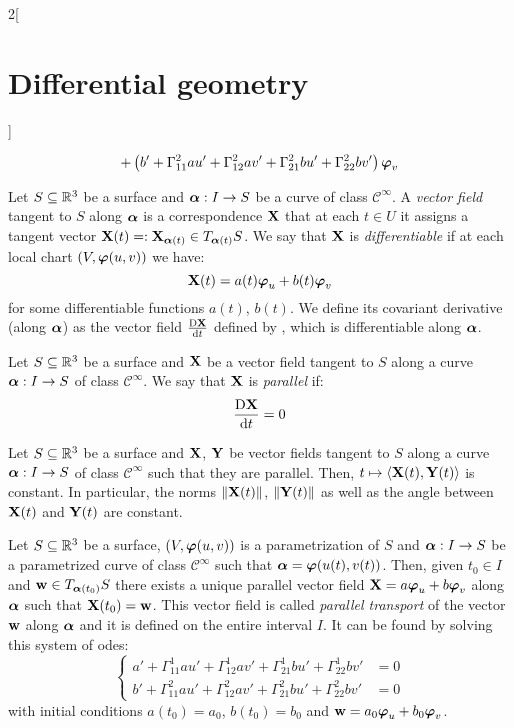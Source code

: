 \documentclass[../../../main_math.tex]{subfiles}
\begin{document}
\begin{multicols}{2}[\section{Differential geometry}]
\begin{proposition}
\begin{multline}
      +\left(b'+\Gamma_{11}^2au'+\Gamma_{12}^2av'+\Gamma_{21}^2bu'+\Gamma_{22}^2bv'\right)\boldsymbol{\mathrm{\varphi}}_v
    \end{multline}
  \end{proposition}
  \begin{definition}
    Let $S\subseteq\mathbb{R}^3$ be a surface and $\boldsymbol{\mathrm{\alpha}}:I\rightarrow S$ be a curve of class $\mathcal{C}^\infty$. A \emph{vector field} tangent to $S$ along $\boldsymbol{\mathrm{\alpha}}$ is a correspondence $\boldsymbol{\mathrm{X}}$ that at each $t\in U$ it assigns a tangent vector $\boldsymbol{\mathrm{X}}(t)=:\boldsymbol{\mathrm{X}}_{\boldsymbol{\mathrm{\alpha}}(t)}\in T_{\boldsymbol{\mathrm{\alpha}}(t)}S$. We say that $\boldsymbol{\mathrm{X}}$ is \emph{differentiable} if at each local chart $(V,\boldsymbol{\mathrm{\varphi}}(u,v))$ we have: $$\boldsymbol{\mathrm{X}}(t)=a(t)\boldsymbol{\mathrm{\varphi}}_u+b(t)\boldsymbol{\mathrm{\varphi}}_v$$ for some differentiable functions $a(t)$, $b(t)$. We define its covariant derivative (along $\boldsymbol{\mathrm{\alpha}}$) as the vector field $\frac{\text{D}\boldsymbol{\mathrm{X}}}{\dd{t}}$ defined by , which is differentiable along $\boldsymbol{\mathrm{\alpha}}$.
  \end{definition}
  \begin{definition}
    Let $S\subseteq\mathbb{R}^3$ be a surface and $\boldsymbol{\mathrm{X}}$ be a vector field tangent to $S$ along a curve $\boldsymbol{\mathrm{\alpha}}:I\rightarrow S$ of class $\mathcal{C}^\infty$. We say that $\boldsymbol{\mathrm{X}}$ is \emph{parallel} if: $$\frac{\text{D}\boldsymbol{\mathrm{X}}}{\dd{t}}=0$$
  \end{definition}
  \begin{proposition}
    Let $S\subseteq\mathbb{R}^3$ be a surface and $\boldsymbol{\mathrm{X}}$, $\boldsymbol{\mathrm{Y}}$ be vector fields tangent to $S$ along a curve $\boldsymbol{\mathrm{\alpha}}:I\rightarrow S$ of class $\mathcal{C}^\infty$ such that they are parallel. Then, $t\mapsto\langle \boldsymbol{\mathrm{X}}(t),\boldsymbol{\mathrm{Y}}(t)\rangle$ is constant. In particular, the norms $\|\boldsymbol{\mathrm{X}}(t)\|$, $\|\boldsymbol{\mathrm{Y}}(t)\|$ as well as the angle between $\boldsymbol{\mathrm{X}}(t)$ and $\boldsymbol{\mathrm{Y}}(t)$ are constant.
  \end{proposition}
  \begin{proposition}
    Let $S\subseteq\mathbb{R}^3$ be a surface, $(V,\boldsymbol{\mathrm{\varphi}}(u,v))$ is a parametrization of $S$ and $\boldsymbol{\mathrm{\alpha}}: I\rightarrow S$ be a parametrized curve of class $\mathcal{C}^\infty$ such that $\boldsymbol{\mathrm{\alpha}}=\boldsymbol{\mathrm{\varphi}}(u(t),v(t))$. Then, given $t_0\in I$ and $\boldsymbol{\mathrm{w}}\in T_{\boldsymbol{\mathrm{\alpha}}(t_0)}S$ there exists a unique parallel vector field $\boldsymbol{\mathrm{X}}=a\boldsymbol{\mathrm{\varphi}}_u+b\boldsymbol{\mathrm{\varphi}}_v$ along $\boldsymbol{\mathrm{\alpha}}$ such that $\boldsymbol{\mathrm{X}}(t_0)=\boldsymbol{\mathrm{w}}$. This vector field is called \emph{parallel transport} of the vector $\boldsymbol{\mathrm{w}}$ along $\boldsymbol{\mathrm{\alpha}}$ and it is defined on the entire interval $I$. It can be found by solving this system of odes:
    $$\left\{
      \begin{aligned}
        a'+\Gamma_{11}^1au'+\Gamma_{12}^1av'+\Gamma_{21}^1bu'+\Gamma_{22}^1bv' & =0 \\
        b'+\Gamma_{11}^2au'+\Gamma_{12}^2av'+\Gamma_{21}^2bu'+\Gamma_{22}^2bv' & =0
      \end{aligned}
      \right.
    $$
    with initial conditions $a(t_0)=a_0$, $b(t_0)=b_0$ and $\boldsymbol{\mathrm{w}}=a_0\boldsymbol{\mathrm{\varphi}}_u+b_0\boldsymbol{\mathrm{\varphi}}_v$.
  \end{proposition}

\end{multicols}
\end{document}
